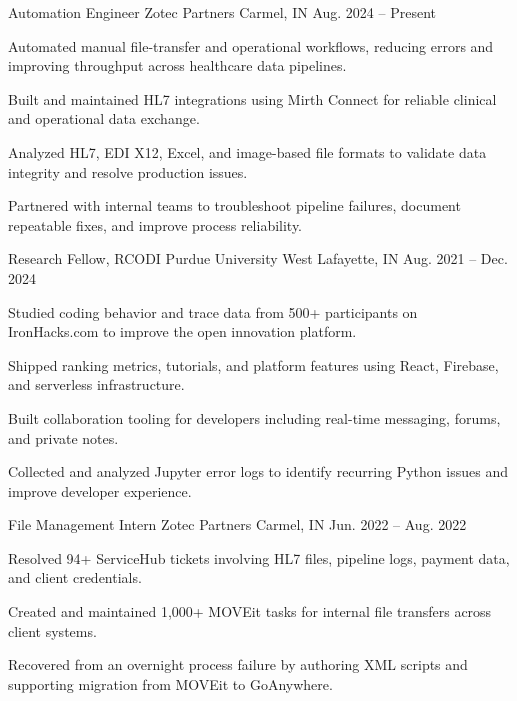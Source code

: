 

\begin{cventries}

  \cventry
    {Automation Engineer}
    {Zotec Partners}
    {Carmel, IN}
    {Aug. 2024 -- Present}
    {
      \begin{cvitems}
        \item {Automated manual file-transfer and operational workflows, reducing errors and improving throughput across healthcare data pipelines.}
        \item {Built and maintained HL7 integrations using Mirth Connect for reliable clinical and operational data exchange.}
        \item {Analyzed HL7, EDI X12, Excel, and image-based file formats to validate data integrity and resolve production issues.}
        \item {Partnered with internal teams to troubleshoot pipeline failures, document repeatable fixes, and improve process reliability.}
      \end{cvitems}
    }

  \cventry
    {Research Fellow, RCODI}
    {Purdue University}
    {West Lafayette, IN}
    {Aug. 2021 -- Dec. 2024}
    {
      \begin{cvitems}
        \item {Studied coding behavior and trace data from 500+ participants on IronHacks.com to improve the open innovation platform.}
        \item {Shipped ranking metrics, tutorials, and platform features using React, Firebase, and serverless infrastructure.}
        \item {Built collaboration tooling for developers including real-time messaging, forums, and private notes.}
        \item {Collected and analyzed Jupyter error logs to identify recurring Python issues and improve developer experience.}
      \end{cvitems}
    }

  \cventry
    {File Management Intern}
    {Zotec Partners}
    {Carmel, IN}
    {Jun. 2022 -- Aug. 2022}
    {
      \begin{cvitems}
        \item {Resolved 94+ ServiceHub tickets involving HL7 files, pipeline logs, payment data, and client credentials.}
        \item {Created and maintained 1,000+ MOVEit tasks for internal file transfers across client systems.}
        \item {Recovered from an overnight process failure by authoring XML scripts and supporting migration from MOVEit to GoAnywhere.}
      \end{cvitems}
    }

\end{cventries}
